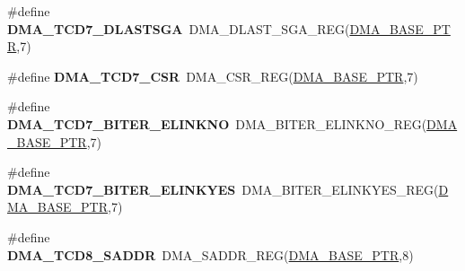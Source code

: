 \begin{DoxyCompactItemize}
\item 
\hypertarget{group___d_m_a___register___accessor___macros_ga23e818dc306809fc9a3a2b7e46a69ef0}{}\#define {\bfseries D\+M\+A\+\_\+\+T\+C\+D7\+\_\+\+D\+L\+A\+S\+T\+S\+G\+A}~D\+M\+A\+\_\+\+D\+L\+A\+S\+T\+\_\+\+S\+G\+A\+\_\+\+R\+E\+G(\hyperlink{group___d_m_a___peripheral_ga6997fbc1b1973e9f27170217a3bd6f22}{D\+M\+A\+\_\+\+B\+A\+S\+E\+\_\+\+P\+T\+R},7)\label{group___d_m_a___register___accessor___macros_ga23e818dc306809fc9a3a2b7e46a69ef0}

\item 
\hypertarget{group___d_m_a___register___accessor___macros_ga3e5e4f7009e022d05759c2c0fe27f647}{}\#define {\bfseries D\+M\+A\+\_\+\+T\+C\+D7\+\_\+\+C\+S\+R}~D\+M\+A\+\_\+\+C\+S\+R\+\_\+\+R\+E\+G(\hyperlink{group___d_m_a___peripheral_ga6997fbc1b1973e9f27170217a3bd6f22}{D\+M\+A\+\_\+\+B\+A\+S\+E\+\_\+\+P\+T\+R},7)\label{group___d_m_a___register___accessor___macros_ga3e5e4f7009e022d05759c2c0fe27f647}

\item 
\hypertarget{group___d_m_a___register___accessor___macros_ga52ee5bb622bffc9bb99342293afbd4ba}{}\#define {\bfseries D\+M\+A\+\_\+\+T\+C\+D7\+\_\+\+B\+I\+T\+E\+R\+\_\+\+E\+L\+I\+N\+K\+N\+O}~D\+M\+A\+\_\+\+B\+I\+T\+E\+R\+\_\+\+E\+L\+I\+N\+K\+N\+O\+\_\+\+R\+E\+G(\hyperlink{group___d_m_a___peripheral_ga6997fbc1b1973e9f27170217a3bd6f22}{D\+M\+A\+\_\+\+B\+A\+S\+E\+\_\+\+P\+T\+R},7)\label{group___d_m_a___register___accessor___macros_ga52ee5bb622bffc9bb99342293afbd4ba}

\item 
\hypertarget{group___d_m_a___register___accessor___macros_ga93ea45ae3f261c96d302fc05caf8c74f}{}\#define {\bfseries D\+M\+A\+\_\+\+T\+C\+D7\+\_\+\+B\+I\+T\+E\+R\+\_\+\+E\+L\+I\+N\+K\+Y\+E\+S}~D\+M\+A\+\_\+\+B\+I\+T\+E\+R\+\_\+\+E\+L\+I\+N\+K\+Y\+E\+S\+\_\+\+R\+E\+G(\hyperlink{group___d_m_a___peripheral_ga6997fbc1b1973e9f27170217a3bd6f22}{D\+M\+A\+\_\+\+B\+A\+S\+E\+\_\+\+P\+T\+R},7)\label{group___d_m_a___register___accessor___macros_ga93ea45ae3f261c96d302fc05caf8c74f}

\item 
\hypertarget{group___d_m_a___register___accessor___macros_ga20929e81a1414d68284332fe54c3394e}{}\#define {\bfseries D\+M\+A\+\_\+\+T\+C\+D8\+\_\+\+S\+A\+D\+D\+R}~D\+M\+A\+\_\+\+S\+A\+D\+D\+R\+\_\+\+R\+E\+G(\hyperlink{group___d_m_a___peripheral_ga6997fbc1b1973e9f27170217a3bd6f22}{D\+M\+A\+\_\+\+B\+A\+S\+E\+\_\+\+P\+T\+R},8)\label{group___d_m_a___register___accessor___macros_ga20929e81a1414d68284332fe54c3394e}


\end{DoxyCompactItemize}
